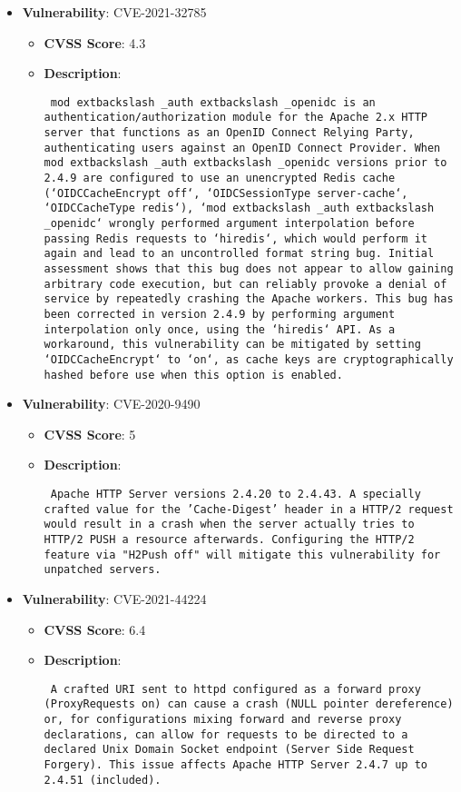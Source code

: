 \documentclass{article}
\begin{document}
\begin{itemize}
        \item \textbf{Vulnerability}: CVE-2021-32785
        \begin{itemize}
            \item \textbf{CVSS Score}:  4.3 
            \item \textbf{Description}: \parbox{\linewidth}{\texttt{ mod	extbackslash _auth	extbackslash _openidc is an authentication/authorization module for the Apache 2.x HTTP server that functions as an OpenID Connect Relying Party, authenticating users against an OpenID Connect Provider. When mod	extbackslash _auth	extbackslash _openidc versions prior to 2.4.9 are configured to use an unencrypted Redis cache (`OIDCCacheEncrypt off`, `OIDCSessionType server-cache`, `OIDCCacheType redis`), `mod	extbackslash _auth	extbackslash _openidc` wrongly performed argument interpolation before passing Redis requests to `hiredis`, which would perform it again and lead to an uncontrolled format string bug. Initial assessment shows that this bug does not appear to allow gaining arbitrary code execution, but can reliably provoke a denial of service by repeatedly crashing the Apache workers. This bug has been corrected in version 2.4.9 by performing argument interpolation only once, using the `hiredis` API. As a workaround, this vulnerability can be mitigated by setting `OIDCCacheEncrypt` to `on`, as cache keys are cryptographically hashed before use when this option is enabled. }}
        \end{itemize}
    
        \item \textbf{Vulnerability}: CVE-2020-9490
        \begin{itemize}
            \item \textbf{CVSS Score}:  5 
            \item \textbf{Description}: \parbox{\linewidth}{\texttt{ Apache HTTP Server versions 2.4.20 to 2.4.43. A specially crafted value for the 'Cache-Digest' header in a HTTP/2 request would result in a crash when the server actually tries to HTTP/2 PUSH a resource afterwards. Configuring the HTTP/2 feature via "H2Push off" will mitigate this vulnerability for unpatched servers. }}
        \end{itemize}
    
        \item \textbf{Vulnerability}: CVE-2021-44224
        \begin{itemize}
            \item \textbf{CVSS Score}:  6.4 
            \item \textbf{Description}: \parbox{\linewidth}{\texttt{ A crafted URI sent to httpd configured as a forward proxy (ProxyRequests on) can cause a crash (NULL pointer dereference) or, for configurations mixing forward and reverse proxy declarations, can allow for requests to be directed to a declared Unix Domain Socket endpoint (Server Side Request Forgery). This issue affects Apache HTTP Server 2.4.7 up to 2.4.51 (included). }}
        \end{itemize}
    

\end{itemize}
\end{document}
